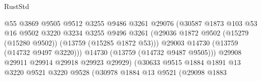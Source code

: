 \begin{lexlean}{RustStd}
\begin{coremodule}
                                            @55
                                            @3869
                                            @9505
                                            @9512
                                            @3255
                                            @9486
                                            @3261
                                            @29076
                                            (@30587
                                              @1873
                                              @103
                                              @53
                                              @16
                                              @9502
                                              @3220
                                              @3234
                                              @3255
                                              @9496
                                              @3261
                                              (@29036
                                                @1872
                                                @9502
                                                (@15279 (@15280 @9502))
                                                (@13759 (@15285 @1872 @53)))
                                              @29003
                                              @14730
                                              (@13759 (@14732 @9497 @3220)))
                                            @14730
                                            (@13759 (@14732 @9487 @9505)))
                                          @29908
                                          @29911
                                          @29914
                                          @29918
                                          @29923
                                          @29929)
                                        (@30633
                                          @9515
                                          @1884
                                          @1891
                                          @13
                                          @3220
                                          @9521
                                          @3220
                                          @9528
                                          (@30978
                                            @1884
                                            @13
                                            @9521
                                            (@29098
                                              @1883

\end{coremodule}
\end{lexlean}
